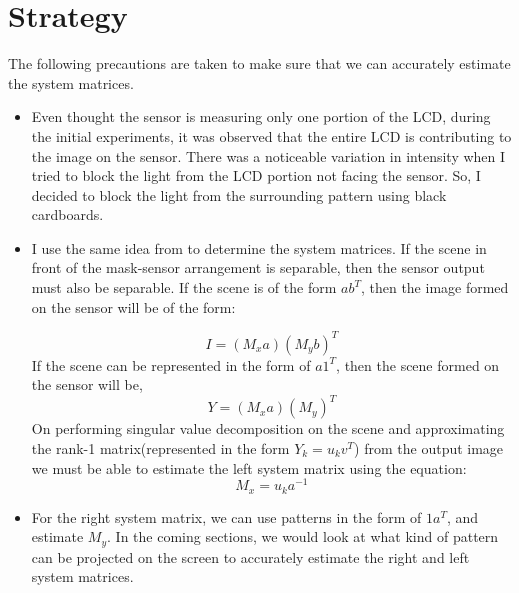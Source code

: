 \section{Strategy}
The following precautions are taken to make sure that we can accurately estimate the system matrices.
\begin{itemize}
\item Even thought the sensor is measuring only one portion of the LCD, during the initial experiments, it was observed that the entire LCD is contributing to the image on the sensor. There was a noticeable variation in intensity when I tried to block the light from the LCD portion not facing the sensor. So, I decided to block the light from the surrounding pattern using black cardboards.
\item I use the same idea from \cite{Flatcam} to determine the system matrices. If the scene in front of the mask-sensor arrangement is separable, then the sensor output must also be separable. If the scene is of the form $ab^T$, then the image formed on the sensor will be of the form:

\begin{equation}
I = (M_xa)(M_yb)^T
\end{equation}
If the scene can be represented in the form of $a1^T$, then the scene formed on the sensor will be,
\begin{equation}
Y = (M_xa)(M_y)^T
\label{eq:separ_eq}
\end{equation}
On performing singular value decomposition on the scene and approximating the rank-1 matrix(represented in the form $Y_k = u_k v^T$) from the output image we must be able to estimate the left system matrix using the equation:
\begin{equation}
M_x = u_ka^{-1}
\end{equation}
\item For the right system matrix, we can use patterns in the form of $1a^T$, and estimate $M_y$. In the coming sections, we would look at what kind of pattern can be projected on the screen to accurately estimate the right and left system matrices. 
\end{itemize}
